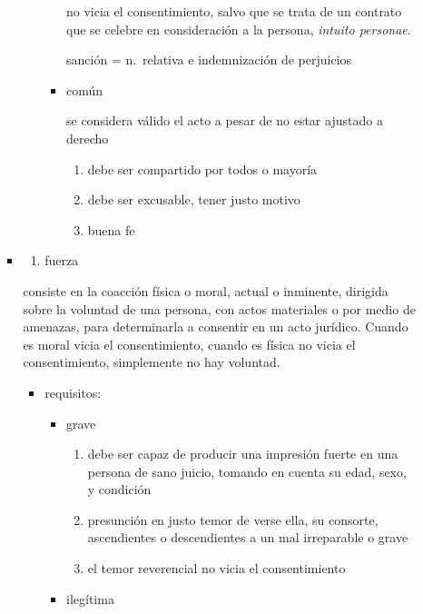 \documentclass[]{article}
\providecommand{\tightlist}{%
  \setlength{\itemsep}{0pt}\setlength{\parskip}{0pt}}
\begin{document}
\begin{itemize}
\begin{itemize}
\begin{enumerate}
\begin{itemize}
\begin{itemize}
          no vicia el consentimiento, salvo que se trata de un contrato
          que se celebre en consideración a la persona, \emph{intuito
          personae}.

          sanción = n.~relativa e indemnización de perjuicios
        \item
          común

          se considera válido el acto a pesar de no estar ajustado a
          derecho

          \begin{enumerate}
          \def\labelenumii{\arabic{enumii}.}
          \tightlist
          \item
            debe ser compartido por todos o mayoría
          \item
            debe ser excusable, tener justo motivo
          \item
            buena fe
          \end{enumerate}
        \end{itemize}
      \end{itemize}
    \end{enumerate}

    \begin{itemize}
    \item
      \begin{enumerate}
      \def\labelenumi{\alph{enumi})}
      \setcounter{enumi}{1}
      \tightlist
      \item
        fuerza
      \end{enumerate}

      consiste en la coacción física o moral, actual o inminente,
      dirigida sobre la voluntad de una persona, con actos materiales o
      por medio de amenazas, para determinarla a consentir en un acto
      jurídico. Cuando es moral vicia el consentimiento, cuando es
      física no vicia el consentimiento, simplemente no hay voluntad.

      \begin{itemize}
      \tightlist
      \item
        requisitos:

        \begin{itemize}
        \item
          grave

          \begin{enumerate}
          \def\labelenumi{\arabic{enumi}.}
          \tightlist
          \item
            debe ser capaz de producir una impresión fuerte en una
            persona de sano juicio, tomando en cuenta su edad, sexo, y
            condición
          \item
            presunción en justo temor de verse ella, su consorte,
            ascendientes o descendientes a un mal irreparable o grave
          \item
            el temor reverencial no vicia el consentimiento
          \end{enumerate}
        \item
          ilegítima


\end{itemize}
\end{itemize}
\end{itemize}
\end{itemize}
\end{itemize}
\end{document}
